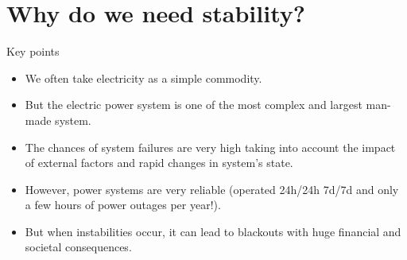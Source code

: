 \section{Why do we need stability?}

\begin{frame} {Key points}
\begin{itemize}
    \item We often take electricity as a simple commodity.
    \item But the electric power system is one of the most complex and largest man-made system.
    \item The chances of system failures are very high taking into account the impact of external factors and rapid changes in system's state.
    \item However, power systems are very reliable (operated 24h/24h 7d/7d and only a few hours of power outages per year!).
    \item But when instabilities occur, it can lead to blackouts with huge financial and societal consequences.
\end{itemize}
\end{frame}

